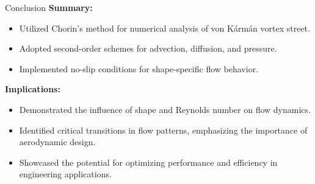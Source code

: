 \begin{frame}{Conclusion}
    \textbf{Summary:}
    \begin{itemize}
        \item Utilized Chorin's method for numerical analysis of von Kármán vortex street.
        \item Adopted second-order schemes for advection, diffusion, and pressure.
        \item Implemented no-slip conditions for shape-specific flow behavior.
    \end{itemize}
    
    \textbf{Implications:}
    \begin{itemize}
        \item Demonstrated the influence of shape and Reynolds number on flow dynamics.
        \item Identified critical transitions in flow patterns, emphasizing the importance of aerodynamic design.
        \item Showcased the potential for optimizing performance and efficiency in engineering applications.
    \end{itemize}
\end{frame}
